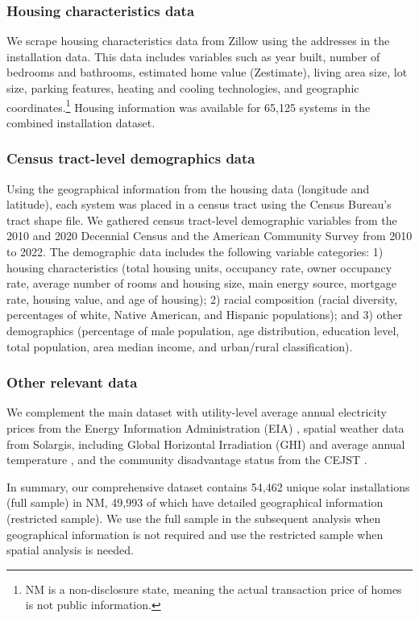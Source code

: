 \documentclass[11pt,twoside,letterpaper]{article}
\begin{document}
\subsubsection{Housing characteristics data}

We scrape housing characteristics data from Zillow using the addresses in the installation data. This data includes variables such as year built, number of bedrooms and bathrooms, estimated home value (Zestimate), living area size, lot size, parking features, heating and cooling technologies, and geographic coordinates.\footnote{NM is a non-disclosure state, meaning the actual transaction price of homes is not public information.} Housing information was available for 65,125 systems in the combined installation dataset.

\subsubsection{Census tract-level demographics data}

Using the geographical information from the housing data (longitude and latitude), each system was placed in a census tract using the Census Bureau’s tract shape file. We gathered census tract-level demographic variables from the 2010 and 2020 Decennial Census and the American Community Survey from 2010 to 2022. The demographic data includes the following variable categories: 1) housing characteristics (total housing units, occupancy rate, owner occupancy rate, average number of rooms and housing size, main energy source, mortgage rate, housing value, and age of housing); 2) racial composition (racial diversity, percentages of white, Native American, and Hispanic populations); and 3) other demographics (percentage of male population, age distribution, education level, total population, area median income, and urban/rural classification).

\subsubsection{Other relevant data}

We complement the main dataset with utility-level average annual electricity prices from the Energy Information Administration (EIA) \parencite{eiaprice}, spatial weather data from Solargis, including Global Horizontal Irradiation (GHI) and average annual temperature \parencite{solargis}, and the community disadvantage status from the CEJST \parencite{cejst}.

In summary, our comprehensive dataset contains 54,462 unique solar installations (full sample) in NM, 49,993 of which have detailed geographical information (restricted sample). We use the full sample in the subsequent analysis when geographical information is not required and use the restricted sample when spatial analysis is needed.
\end{document}
